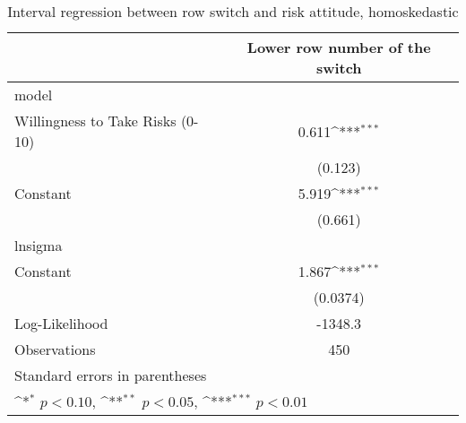 \begin{table}[htbp]\centering
\def\sym#1{\ifmmode^{#1}\else\(^{#1}\)\fi}
\caption{Interval regression between row switch and risk attitude, homoskedastic}
\begin{tabular}{l*{1}{c}}
\hline\hline
                    &\multicolumn{1}{c}{Lower row number of the switch}\\
\hline
model               &                     \\
Willingness to Take Risks (0-10)&       0.611\sym{***}\\
                    &     (0.123)         \\
[1em]
Constant            &       5.919\sym{***}\\
                    &     (0.661)         \\
\hline
lnsigma             &                     \\
Constant            &       1.867\sym{***}\\
                    &    (0.0374)         \\
\hline
Log-Likelihood      &     -1348.3         \\
Observations        &         450         \\
\hline\hline
\multicolumn{2}{l}{\footnotesize Standard errors in parentheses}\\
\multicolumn{2}{l}{\footnotesize \sym{*} \(p<0.10\), \sym{**} \(p<0.05\), \sym{***} \(p<0.01\)}\\
\end{tabular}
\end{table}
